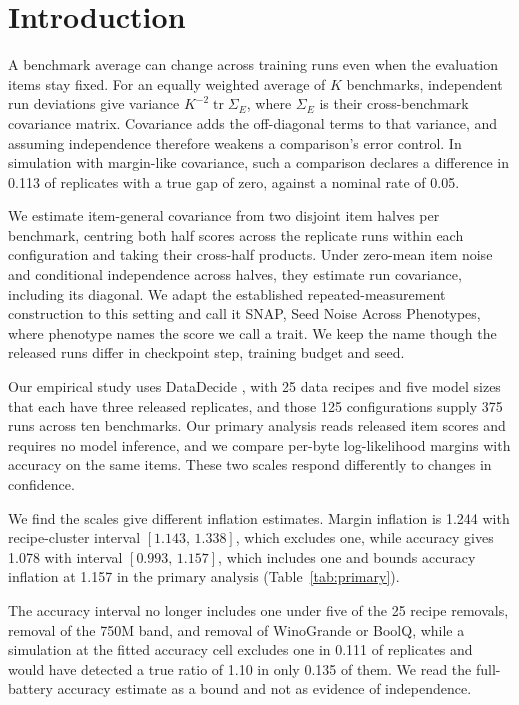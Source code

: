 \documentclass{article}
\newcommand{\ci}[2]{\ensuremath{[#1,\,#2]}}
\newcommand{\Sig}{\Sigma_E}
\begin{document}
\section{Introduction}
A benchmark average can change across training runs even when the evaluation items stay fixed. For an equally weighted average of $K$ benchmarks, independent run deviations give variance $K^{-2}\operatorname{tr}\Sig$, where $\Sig$ is their cross-benchmark covariance matrix. Covariance adds the off-diagonal terms to that variance, and assuming independence therefore weakens a comparison's error control. In simulation with margin-like covariance, such a comparison declares a difference in 0.113 of replicates with a true gap of zero, against a nominal rate of 0.05.

We estimate item-general covariance from two disjoint item halves per benchmark, centring both half scores across the replicate runs within each configuration and taking their cross-half products. Under zero-mean item noise and conditional independence across halves, they estimate run covariance, including its diagonal. We adapt the established repeated-measurement construction to this setting and call it SNAP, Seed Noise Across Phenotypes, where phenotype names the score we call a trait. We keep the name though the released runs differ in checkpoint step, training budget and seed.

Our empirical study uses DataDecide \citep{magnusson2025}, with 25 data recipes and five model sizes that each have three released replicates, and those 125 configurations supply 375 runs across ten benchmarks. Our primary analysis reads released item scores and requires no model inference, and we compare per-byte log-likelihood margins with accuracy on the same items. These two scales respond differently to changes in confidence.

We find the scales give different inflation estimates. Margin inflation is 1.244 with recipe-cluster interval \ci{1.143}{1.338}, which excludes one, while accuracy gives 1.078 with interval \ci{0.993}{1.157}, which includes one and bounds accuracy inflation at 1.157 in the primary analysis (Table~\ref{tab:primary}).

The accuracy interval no longer includes one under five of the 25 recipe removals, removal of the 750M band, and removal of WinoGrande or BoolQ, while a simulation at the fitted accuracy cell excludes one in 0.111 of replicates and would have detected a true ratio of 1.10 in only 0.135 of them. We read the full-battery accuracy estimate as a bound and not as evidence of independence.
\end{document}
